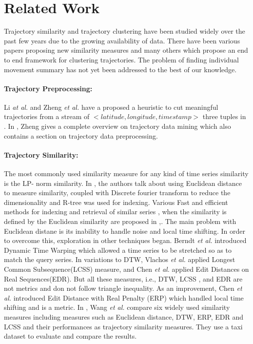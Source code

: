 \section{Related Work}
Trajectory similarity and trajectory clustering have been studied widely over the past few years due to the growing availability of data. There have been various papers proposing new similarity measures and many others which propose an end to end framework for clustering trajectories. The problem of finding individual movement summary has not yet been addressed to the best of our knowledge. 
\paragraph{Trajectory Preprocessing:}
Li \emph{at al.} and Zheng \emph{et al.} have a proposed a heuristic to cut meaningful trajectories from a stream of $<latitude, longitude, timestamp>$ three tuples in \cite{trajcut1,trajcut2}. In \cite{trajcut3}, Zheng gives a complete overview on trajectory data mining which also contains a section on trajectory data preprocessing.  

\paragraph{Trajectory Similarity:}
The most commonly used similarity measure for any kind of time series similarity is the LP- norm similarity. In \cite{lp1}, the authors talk about using Euclidean distance to measure similarity, coupled with Discrete fourier transform to reduce the dimensionality and R-tree was used for indexing. Various Fast and efficient methods for indexing and retrieval of similar series , when the similarity is defined by the Euclidean similarity are proposed in \cite{lp1},\cite{lp2}. 
The main problem with Euclidean distane is its inability to handle noise and local time shifting. In order to overcome this, exploration in other techniques began. Berndt \emph{et al.} \cite{dtw} introduced Dynamic Time Warping which allowed  a time series to be stretched so as to match the query series. In variations to DTW, Vlachos \emph{et al.} \cite{Vlachos2002} applied Longest Common Subsequence(LCSS) measure, and Chen \emph{et al.}\cite{Chen2005} applied  Edit Distances on Real Sequences(EDR). But all these measures, i.e., DTW, LCSS , and EDR are not metrics and don not follow triangle inequality. As an improvement, Chen \emph{et al.}\cite{Chen2005} introduced Edit Distance with Real Penalty (ERP) which handled local time shifting and is a metric. In \cite{simcomp}, Wang \emph{et al.} compare six widely used similarity measures including measures such as Euclidean distance, DTW, ERP, EDR and LCSS and their performances as trajectory similarity measures. They use a taxi dataset to evaluate and compare the results. 

